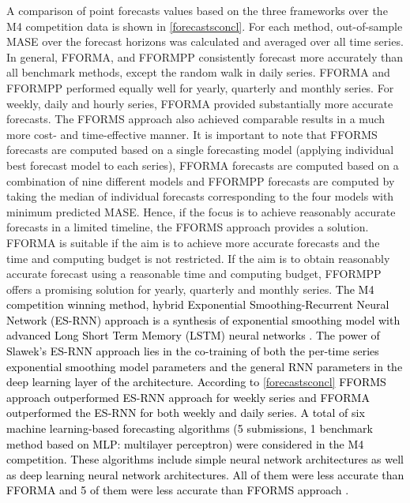 \documentclass{monashthesis}
\begin{document}
A comparison of point forecasts values based on the three frameworks over the M4 competition data is shown in \autoref{forecastsconcl}. For each method, out-of-sample MASE over the forecast horizons was calculated and averaged over all time series. In general, FFORMA, and FFORMPP consistently forecast more accurately than all benchmark methods, except the random walk in daily series. FFORMA and FFORMPP performed equally well for yearly, quarterly and monthly series. For weekly, daily and hourly series, FFORMA provided substantially more accurate forecasts. The FFORMS approach also achieved comparable results in a much more cost- and time-effective manner. It is important to note that FFORMS forecasts are computed based on a single forecasting model (applying individual best forecast model to each series), FFORMA forecasts are computed based on a combination of nine different models and FFORMPP forecasts are computed by taking the median of individual forecasts corresponding to the four models with minimum predicted MASE. Hence, if the focus is to achieve reasonably accurate forecasts in a limited timeline, the FFORMS approach provides a solution. FFORMA is suitable if the aim is to achieve more accurate forecasts and the time and computing budget is not restricted. If the aim is to obtain reasonably accurate forecast using a reasonable time and computing budget, FFORMPP offers a promising solution for yearly, quarterly and monthly series. \textcolor{black}{The M4 competition winning method, hybrid Exponential Smoothing-Recurrent Neural Network (ES-RNN) approach is a synthesis of exponential smoothing model with advanced Long Short Term Memory (LSTM) neural networks} \autocite{smyl2019hybrid} \textcolor{black}{. The power of Slawek's ES-RNN approach lies in the co-training of both the per-time series exponential smoothing model parameters and the general RNN parameters in the deep learning layer of the architecture. According to} \autoref{forecastsconcl} \textcolor{black}{FFORMS approach outperformed ES-RNN approach for weekly series and FFORMA outperformed the ES-RNN for both weekly and daily series.} \textcolor{black}{A total of six  machine learning-based forecasting algorithms (5 submissions, 1 benchmark method based on MLP: multilayer perceptron) were considered in the M4 competition. These algorithms include simple neural network architectures as well as deep learning neural network architectures. All of them were less accurate than FFORMA and 5 of them were less accurate than FFORMS approach} \autocite{makridakis2019m4} \textcolor{black}{.}
\end{document}
